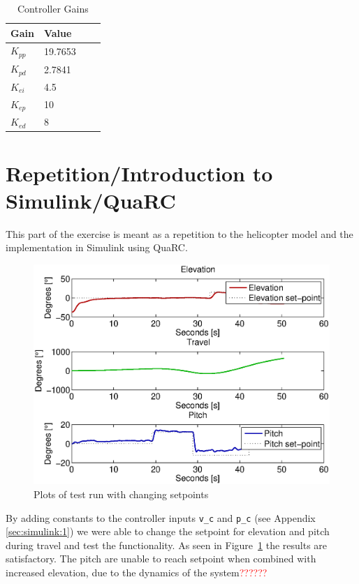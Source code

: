 \documentclass[11pt,a4paper,USenglish]{article} %
\begin{document}
\begin{table}[h]
	\centering
	\caption{Controller Gains}
	\begin{tabular}{llll}
		\hline
		Gain & Value\\
        \hline
		$K_{pp}$ & 19.7653\\
		$K_{pd}$ & 2.7841\\
		$K_{ei}$ & 4.5\\
		$K_{ep}$ & 10\\
		$K_{ed}$ & 8\\
		\hline
	\end{tabular}
	\label{tab:gains}
\end{table}

\section{Repetition/Introduction to Simulink/QuaRC}\label{sec:prob1}
This part of the exercise is meant as a repetition to the helicopter model and the implementation in Simulink using QuaRC.
\begin{figure}[!h]
\centerline{\includegraphics[width=1\textwidth]{graph1}}
\caption{Plots of test run with changing setpoints}
\label{fig:testrunplot}
\end{figure}

By adding constants to the controller inputs \verb!v_c! and \verb!p_c! (see Appendix \ref{sec:simulink:1}) we were able to change the setpoint for elevation and pitch during travel and test the functionality. As seen in Figure~\ref{fig:testrunplot} the results are satisfactory. The pitch are unable to reach setpoint when combined with increased elevation, due to the dynamics of the system\textcolor{red}{??????}
\end{document}
